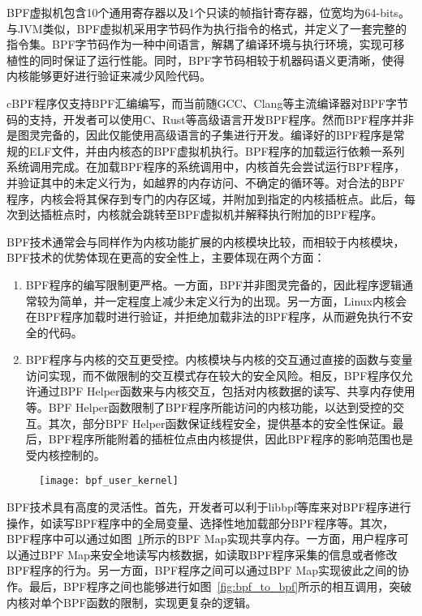BPF虚拟机包含10个通用寄存器以及1个只读的帧指针寄存器，位宽均为64-bits。与JVM类似，BPF虚拟机采用字节码作为执行指令的格式，并定义了一套完整的指令集。BPF字节码作为一种中间语言，解耦了编译环境与执行环境，实现可移植性的同时保证了运行性能。同时，BPF字节码相较于机器码语义更清晰，使得内核能够更好进行验证来减少风险代码。

cBPF程序仅支持BPF汇编编写，而当前随GCC、Clang等主流编译器对BPF字节码的支持，开发者可以使用C、Rust等高级语言开发BPF程序\citep{ebpfguidence}。然而BPF程序并非是图灵完备的，因此仅能使用高级语言的子集进行开发。编译好的BPF程序是常规的ELF文件，并由内核态的BPF虚拟机执行。BPF程序的加载运行依赖一系列系统调用完成。在加载BPF程序的系统调用中，内核首先会尝试运行BPF程序，并验证其中的未定义行为，如越界的内存访问、不确定的循环等。对合法的BPF程序，内核会将其保存到专门的内存区域，并附加到指定的内核插桩点。此后，每次到达插桩点时，内核就会跳转至BPF虚拟机并解释执行附加的BPF程序。

BPF技术通常会与同样作为内核功能扩展的内核模块比较，而相较于内核模块，BPF技术的优势体现在更高的安全性上，主要体现在两个方面：

\begin{enumerate}
    \item BPF程序的编写限制更严格。一方面，BPF并非图灵完备的，因此程序逻辑通常较为简单，并一定程度上减少未定义行为的出现。另一方面，Linux内核会在BPF程序加载时进行验证，并拒绝加载非法的BPF程序，从而避免执行不安全的代码。
    \item BPF程序与内核的交互更受控。内核模块与内核的交互通过直接的函数与变量访问实现，而不做限制的交互模式存在较大的安全风险。相反，BPF程序仅允许通过BPF Helper函数来与内核交互，包括对内核数据的读写、共享内存使用等。BPF Helper函数限制了BPF程序所能访问的内核功能，以达到受控的交互。其次，部分BPF Helper函数保证线程安全，提供基本的安全性保证。最后，BPF程序所能附着的插桩位点由内核提供，因此BPF程序的影响范围也是受内核控制的。
\end{enumerate}

\begin{figure}[!htbp]
    \centering
    \texttt{[image: bpf\_user\_kernel]}
    \label{fig:bpf_user_kernel}
\end{figure}

BPF技术具有高度的灵活性。首先，开发者可以利于libbpf等库来对BPF程序进行操作，如读写BPF程序中的全局变量、选择性地加载部分BPF程序等。其次，BPF程序中可以通过如图~\ref{fig:bpf_user_kernel}所示的BPF Map实现共享内存。一方面，用户程序可以通过BPF Map来安全地读写内核数据，如读取BPF程序采集的信息或者修改BPF程序的行为。另一方面，BPF程序之间可以通过BPF Map实现彼此之间的协作。最后，BPF程序之间也能够进行如图~\ref{fig:bpf_to_bpf}所示的相互调用，突破内核对单个BPF函数的限制，实现更复杂的逻辑。


